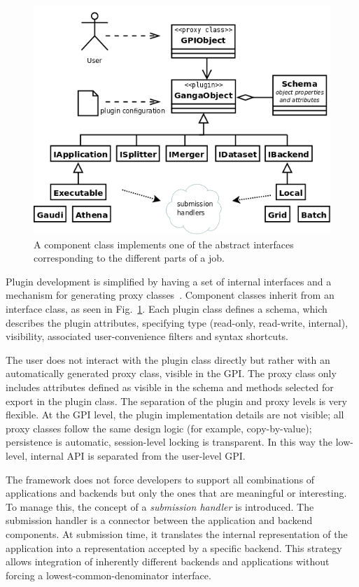 \documentclass{elsart}
\def\GPI{GPI\xspace}
\begin{document}
\begin{figure}
  \centering
  \includegraphics[width=14cm]{ganga-objects}  
  \caption{A component class implements one of the abstract interfaces
    corresponding to the different parts of a job.}
  \label{fig:Components}
\end{figure}
Plugin development is simplified by having a set of internal interfaces and a
mechanism for generating proxy classes~\cite{GoF}. Component classes inherit from an interface class,
as seen in Fig.~\ref{fig:Components}. Each plugin class defines a schema, which
describes the plugin attributes, specifying type
(read-only, read-write, internal), visibility, associated user-convenience filters
and syntax shortcuts.

The user does not interact with the plugin class directly but rather with an
automatically generated proxy class, visible in the \GPI. The proxy
class only includes attributes defined as visible in the schema and methods
selected for export in the plugin class. The separation of the plugin and
proxy levels is very flexible. At the \GPI level, the plugin implementation
details are not visible; all proxy classes follow the same design logic (for
example, copy-by-value); persistence is automatic, session-level locking
is transparent. In this way the low-level, internal API is
separated from the user-level \GPI.

The framework does not force developers to support all combinations of
applications and backends but only the ones that are meaningful or interesting. To manage
this, the concept of a {\em submission handler} is introduced. The submission
handler is a connector between the application and backend components. At
submission time, it translates the internal representation of the application
into a representation accepted by a specific backend. This strategy allows
integration of inherently different backends and applications without forcing
a lowest-common-denominator interface.
\end{document}
